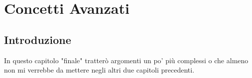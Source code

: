 
\chapter{Concetti Avanzati}














\section{Introduzione}

\textsf{\small In questo capitolo "finale" tratterò argomenti un po' più complessi o che almeno non mi verrebbe da mettere negli altri due capitoli precedenti.} \\

